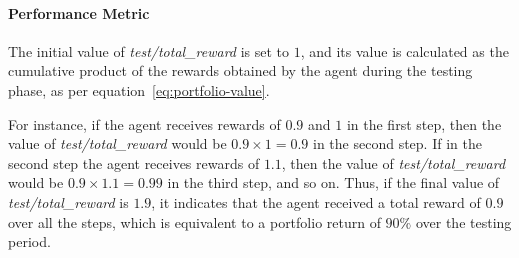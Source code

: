 \documentclass[../xlapes02]{subfiles}
\begin{document}
    \paragraph{Performance Metric}
    The initial value of \emph{test/total\_reward} is set to $1$, and its value is calculated as the cumulative product of the rewards obtained by the agent during the testing phase, as per equation~\ref{eq:portfolio-value}.

    For instance, if the agent receives rewards of $0.9$ and $1$ in the first step, then the value of \emph{test/total\_reward} would be $0.9 \times 1 = 0.9$ in the second step. If in the second step the agent receives rewards of $1.1$, then the value of \emph{test/total\_reward} would be $0.9 \times 1.1 = 0.99$ in the third step, and so on. Thus, if the final value of \emph{test/total\_reward} is $1.9$, it indicates that the agent received a total reward of $0.9$ over all the steps, which is equivalent to a portfolio return of $90\%$ over the testing period.
\end{document}
